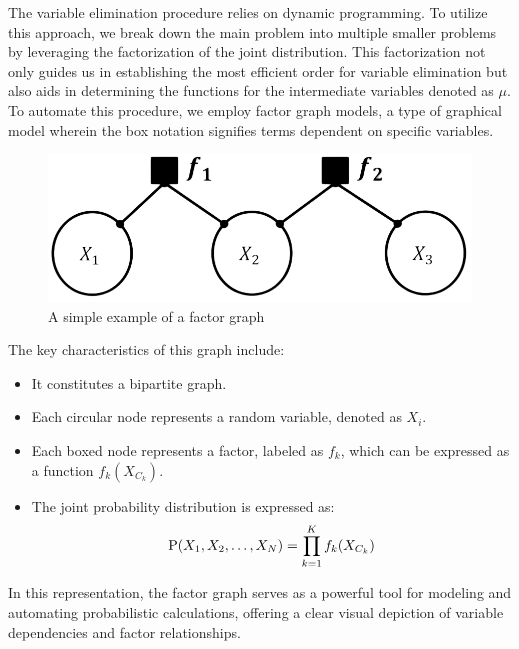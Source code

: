 \documentclass[12pt, a4paper]{report}
\begin{document}
    The variable elimination procedure relies on dynamic programming. 
    To utilize this approach, we break down the main problem into multiple smaller problems by leveraging the factorization of the joint distribution. 
    This factorization not only guides us in establishing the most efficient order for variable elimination but also aids in determining the functions for the intermediate variables denoted as $\mu$.
    To automate this procedure, we employ factor graph models, a type of graphical model wherein the box notation signifies terms dependent on specific variables. 
    \begin{figure}[H]
        \centering
        \includegraphics[width=0.25\linewidth]{images/fg.png}
        \caption{A simple example of a factor graph}
    \end{figure}
    The key characteristics of this graph include:
    \begin{itemize}
        \item It constitutes a bipartite graph.
        \item Each circular node represents a random variable, denoted as $X_i$.
        \item Each boxed node represents a factor, labeled as $f_k$, which can be expressed as a function $f_k(X_{C_k})$. 
        \item The joint probability distribution is expressed as:
            \[\textnormal{P}(X_1,X_2,\dots,X_N)=\prod_{k=1}^K{f_k(X_{C_k})}\]
    \end{itemize}
    In this representation, the factor graph serves as a powerful tool for modeling and automating probabilistic calculations, offering a clear visual depiction of variable dependencies and factor relationships.
    
\end{document}
